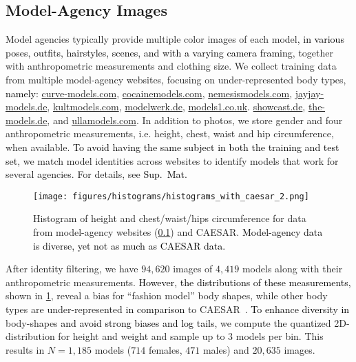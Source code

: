 \documentclass[10pt,twocolumn,letterpaper]{article}
\newcommand{\twoD}{2D\xspace}
\newcommand{\caesar}{\mbox{CAESAR}\xspace}
\newcommand{\supmat}{{\mbox{\textcolor{black}{Sup.~Mat.}}}\xspace}
\renewcommand{\ie}{\mbox{i.e.}\xspace}
\newcommand{\cameraready}[1]{\textcolor{Fuchsia}{{#1}}\xspace}
\renewcommand{\cameraready}[1]{\textcolor{black}{{#1}}\xspace}
\newcommand{\colorTERM}{blue}
\renewcommand{\colorTERM}{black}
\newcommand{\measurements}[0]{{\color{\colorTERM}anthropometric measurements}\xspace}
\begin{document}
\subsection{Model-Agency Images}      \label{sec:model_images}

Model agencies typically provide multiple color images of each model, \cameraready{in various poses, outfits, hairstyles, scenes, and with a varying camera framing}, together with 
\measurements
and clothing size.
We collect training data from multiple model-agency websites, focusing on under-represented body types, \cameraready{namely}:
\href{www.curve-models.com}{    \mbox{curve-models.com}},
\href{www.cocainemodels.com}{   \mbox{cocainemodels.com}},
\href{www.nemesismodels.com}{   \mbox{nemesismodels.com}},
\href{www.jayjay-models.de}{    \mbox{jayjay-models.de}},
\href{www.kultmodels.com}{      \mbox{kultmodels.com}},
\href{www.modelwerk.de}{        \mbox{modelwerk.de}},
\href{www.models1.co.uk}{       \mbox{models1.co.uk}}.
\href{showcast.de}{             \mbox{showcast.de}},
\href{www.the-models.de}{       \mbox{the-models.de}}, and
\href{www.ullamodels.com}{      \mbox{ullamodels.com}}.
In addition to photos, we store gender and four \measurements, \ie height, chest, waist and hip circumference, when available. 
\cameraready{To avoid 
having the same subject in both the training and test set}, we match model identities across websites to identify models that work for several agencies. 
For details, see \supmat

\begin{figure}[!t]
    \centering
    \texttt{[image: figures/histograms/histograms\_with\_caesar\_2.png]}
    \caption{Histogram of height and chest/waist/hips circumference for
        data from model-agency websites (\cref{sec:model_images}) and \caesar. \cameraready{Model-agency data is diverse, yet not as much as \caesar data.}
    }
    \label{fig:agencies_histogram}
\end{figure} 

After identity filtering, we have $94,620$ images of $4,419$ models along
with their 
\measurements. 
\cameraready{However, the distributions of these measurements,} shown in \cref{fig:agencies_histogram}, 
reveal a bias for ``fashion model'' body shapes, while other body types are under-represented \cameraready{in comparison} 
to \caesar~\cite{CAESAR}.
\cameraready{To enhance diversity in}
body-shapes \cameraready{and avoid strong biases and log tails}, 
we compute the quantized 
\twoD-distribution for height and weight and sample up to $3$ models per bin.
This results in $N=1,185$ models ($714$ females, $471$ males) and $20,635$ images.
\end{document}
